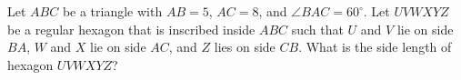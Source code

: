 Let $ABC$ be a triangle with $AB=5$,  $AC=8$,  and $\angle BAC=60^\circ$.  Let $UVWXYZ$ be a regular hexagon that is inscribed inside $ABC$ such that $U$ and $V$ lie on side $BA$,  $W$ and $X$ lie on side $AC$,  and $Z$ lies on side $CB$. What is the side length of hexagon $UVWXYZ$?